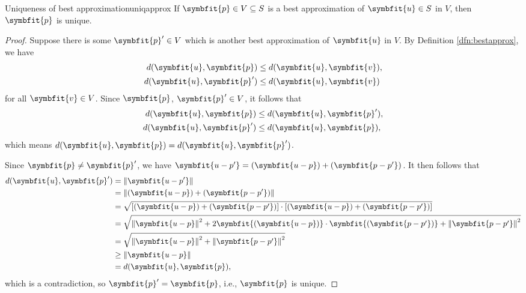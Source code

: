 \documentclass[math]{amznotes}
\theoremstyle{remark}
\begin{document}
\begin{thmbox}{Uniqueness of best approximation}{uniqapprox}
    If $\symbfit{p} \in V \subseteq S$ is a best approximation of $\symbfit{u} \in S$ in $V$, then $\symbfit{p}$ is unique.
    \tcblower
    \begin{proof}
        Suppose there is some $\symbfit{p}' \in V$ which is another best approximation of $\symbfit{u}$ in $V$. By Definition \ref{dfn:bestapprox}, we have
        \begin{align*}
            d(\symbfit{u}, \symbfit{p})  & \leq d(\symbfit{u}, \symbfit{v}), \\
            d(\symbfit{u}, \symbfit{p}') & \leq d(\symbfit{u}, \symbfit{v})
        \end{align*}
        for all $\symbfit{v} \in V$. Since $\symbfit{p}$, $\symbfit{p}' \in V$, it follows that
        \begin{align*}
            d(\symbfit{u}, \symbfit{p})  & \leq d(\symbfit{u}, \symbfit{p}'), \\
            d(\symbfit{u}, \symbfit{p}') & \leq d(\symbfit{u}, \symbfit{p}),
        \end{align*}
        which means $d(\symbfit{u}, \symbfit{p}) = d(\symbfit{u}, \symbfit{p}')$.

        Since $\symbfit{p} \neq \symbfit{p}'$, we have $\symbfit{u - p'} = (\symbfit{u - p}) + (\symbfit{p - p'})$. It then follows that
        \begin{align*}
            d(\symbfit{u}, \symbfit{p}') & = \left\lVert \symbfit{u - p'} \right\rVert                                                                                                                      \\
                                         & = \left\lVert (\symbfit{u - p}) + (\symbfit{p - p'}) \right\rVert                                                                                                \\
                                         & = \sqrt{\left[ (\symbfit{u - p}) + (\symbfit{p - p'}) \right] \cdot \left[ (\symbfit{u - p}) + (\symbfit{p - p'}) \right]}                                       \\
                                         & = \sqrt{\left\lVert\symbfit{u - p}\right\rVert^2 + 2 \symbfit{(\symbfit{u - p})} \cdot \symbfit{(\symbfit{p - p'})} + \left\lVert\symbfit{p - p'}\right\rVert^2} \\
                                         & = \sqrt{\left\lVert\symbfit{u - p}\right\rVert^2 + \left\lVert\symbfit{p - p'}\right\rVert^2}                                                                    \\
                                         & \geq \left\lVert\symbfit{u - p}\right\rVert                                                                                                                      \\
                                         & = d(\symbfit{u}, \symbfit{p}),
        \end{align*}
        which is a contradiction, so $\symbfit{p}' = \symbfit{p}$, i.e., $\symbfit{p}$ is unique.
    \end{proof}
\end{thmbox}
\end{document}
